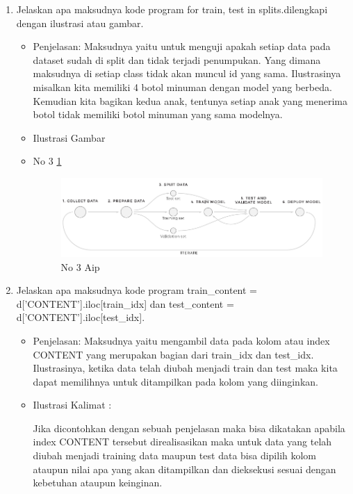 \begin{enumerate}
\item Jelaskan apa maksudnya kode program for train, test in splits.dilengkapi dengan ilustrasi atau gambar.
\begin{itemize}
\item Penjelasan: Maksudnya yaitu untuk menguji apakah setiap data pada dataset sudah di split dan tidak terjadi penumpukan. Yang dimana maksudnya di setiap class tidak akan muncul id yang sama. Ilustrasinya misalkan kita memiliki 4 botol minuman dengan model yang berbeda. Kemudian kita bagikan kedua anak, tentunya setiap anak yang menerima botol tidak memiliki botol minuman  yang sama modelnya.
\par 
\par
\item Ilustrasi Gambar
\item No 3  \ref{teori3}
\begin{figure}[!hbtp]
\centering
\includegraphics[scale=0.2]{figures/AIP/g3.PNG}
\caption{No 3 Aip}
\label{teori3}
\end{figure}
\par
\end{itemize}
\par
\par

\item Jelaskan apa maksudnya kode program {train\_content = d['CONTENT'].iloc[train\_idx]} dan {test\_content = d['CONTENT'].iloc[test\_idx]}.
\begin{itemize}
\item Penjelasan: Maksudnya yaitu mengambil data pada kolom atau index CONTENT yang merupakan bagian dari train\_idx dan test\_idx. Ilustrasinya, ketika data telah diubah menjadi train dan test maka kita dapat memilihnya untuk ditampilkan pada kolom yang diinginkan.
\par 
\par
\item Ilustrasi Kalimat :
\par Jika dicontohkan dengan sebuah penjelasan maka bisa dikatakan apabila index CONTENT tersebut direalisasikan maka untuk data yang telah diubah menjadi training data maupun test data bisa dipilih kolom ataupun nilai apa yang akan ditampilkan dan dieksekusi sesuai dengan kebetuhan ataupun keinginan.
\end{itemize}
\par
\par


\end{enumerate}
